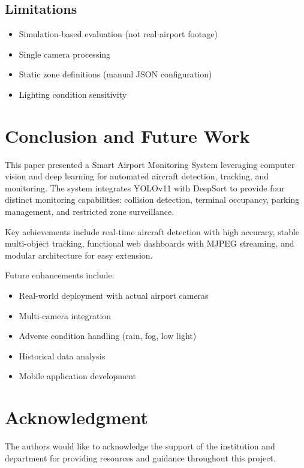 \documentclass[conference]{IEEEtran}
\begin{document}
\subsection{Limitations}
\begin{itemize}
    \item Simulation-based evaluation (not real airport footage)
    \item Single camera processing
    \item Static zone definitions (manual JSON configuration)
    \item Lighting condition sensitivity
\end{itemize}

\section{Conclusion and Future Work}
\label{sec:conclusion}

This paper presented a Smart Airport Monitoring System leveraging computer vision and deep learning for automated aircraft detection, tracking, and monitoring. The system integrates YOLOv11 with DeepSort to provide four distinct monitoring capabilities: collision detection, terminal occupancy, parking management, and restricted zone surveillance.

Key achievements include real-time aircraft detection with high accuracy, stable multi-object tracking, functional web dashboards with MJPEG streaming, and modular architecture for easy extension.

Future enhancements include:
\begin{itemize}
    \item Real-world deployment with actual airport cameras
    \item Multi-camera integration
    \item Adverse condition handling (rain, fog, low light)
    \item Historical data analysis
    \item Mobile application development
\end{itemize}

\section*{Acknowledgment}

The authors would like to acknowledge the support of the institution and department for providing resources and guidance throughout this project.
\end{document}
